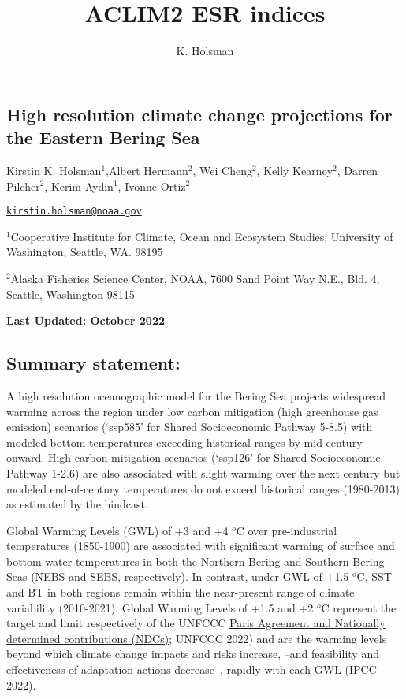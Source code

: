 \documentclass[
]{article}
\title{ACLIM2 ESR indices}
\author{K. Holsman}
\date{}
\begin{document}
\maketitle

\hypertarget{high-resolution-climate-change-projections-for-the-eastern-bering-sea}{%
\subsection{High resolution climate change projections for the Eastern
Bering
Sea}\label{high-resolution-climate-change-projections-for-the-eastern-bering-sea}}

Kirstin K. Holsman\(^1\),Albert Hermann\(^2\), Wei Cheng\(^2\), Kelly
Kearney\(^2\), Darren Pilcher\(^2\), Kerim Aydin\(^1\), Ivonne
Ortiz\(^2\)

\href{mailto:kirstin.holsman@noaa.gov}{\nolinkurl{kirstin.holsman@noaa.gov}}

\(^1\)Cooperative Institute for Climate, Ocean and Ecosystem Studies,
University of Washington, Seattle, WA. 98195

\(^2\)Alaska Fisheries Science Center, NOAA, 7600 Sand Point Way N.E.,
Bld. 4, Seattle, Washington 98115

\textbf{Last Updated: October 2022}

\hypertarget{summary-statement}{%
\subsection{Summary statement:}\label{summary-statement}}

A high resolution oceanographic model for the Bering Sea projects
widespread warming across the region under low carbon mitigation (high
greenhouse gas emission) scenarios (`ssp585' for Shared Socioeconomic
Pathway 5-8.5) with modeled bottom temperatures exceeding historical
ranges by mid-century onward. High carbon mitigation scenarios (`ssp126'
for Shared Socioeconomic Pathway 1-2.6) are also associated with slight
warming over the next century but modeled end-of-century temperatures do
not exceed historical ranges (1980-2013) as estimated by the hindcast.

Global Warming Levels (GWL) of +3 and +4 \(^o\)C over pre-industrial
temperatures (1850-1900) are associated with significant warming of
surface and bottom water temperatures in both the Northern Bering and
Southern Bering Seas (NEBS and SEBS, respectively). In contrast, under
GWL of +1.5 \(^o\)C, SST and BT in both regions remain within the
near-present range of climate variability (2010-2021). Global Warming
Levels of +1.5 and +2 \(^o\)C represent the target and limit
respectively of the UNFCCC
\href{https://unfccc.int/ndc-synthesis-report-2022\#Projected-GHG-Emission-levels}{Paris
Agreement and Nationally determined contributions (NDCs)}; UNFCCC 2022)
and are the warming levels beyond which climate change impacts and risks
increase, --and feasibility and effectiveness of adaptation actions
decrease--, rapidly with each GWL (IPCC 2022).
\end{document}

